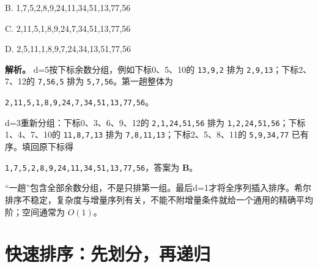 B. 1,7,5,2,8,9,24,11,34,51,13,77,56

C. 2,11,5,1,8,9,24,7,34,51,13,77,56

D. 2,5,11,1,8,9,7,24,34,13,51,77,56


\textbf{解析。} d=5按下标余数分组，例如下标0、5、10的 \allowbreak{}\texttt{13,}\allowbreak{}\texttt{9,}\allowbreak{}\texttt{2} 排为 \allowbreak{}\texttt{2,}\allowbreak{}\texttt{9,}\allowbreak{}\texttt{13}；下标2、7、12的 \allowbreak{}\texttt{7,}\allowbreak{}\texttt{56,}\allowbreak{}\texttt{5} 排为 \allowbreak{}\texttt{5,}\allowbreak{}\texttt{7,}\allowbreak{}\texttt{56}。第一趟整体为

\allowbreak{}\texttt{2,}\allowbreak{}\texttt{11,}\allowbreak{}\texttt{5,}\allowbreak{}\texttt{1,}\allowbreak{}\texttt{8,}\allowbreak{}\texttt{9,}\allowbreak{}\texttt{24,}\allowbreak{}\texttt{7,}\allowbreak{}\texttt{34,}\allowbreak{}\texttt{51,}\allowbreak{}\texttt{13,}\allowbreak{}\texttt{77,}\allowbreak{}\texttt{56}。

d=3重新分组：下标0、3、6、9、12的 \allowbreak{}\texttt{2,}\allowbreak{}\texttt{1,}\allowbreak{}\texttt{24,}\allowbreak{}\texttt{51,}\allowbreak{}\texttt{56} 排为 \allowbreak{}\texttt{1,}\allowbreak{}\texttt{2,}\allowbreak{}\texttt{24,}\allowbreak{}\texttt{51,}\allowbreak{}\texttt{56}；下标1、4、7、10的 \allowbreak{}\texttt{11,}\allowbreak{}\texttt{8,}\allowbreak{}\texttt{7,}\allowbreak{}\texttt{13} 排为 \allowbreak{}\texttt{7,}\allowbreak{}\texttt{8,}\allowbreak{}\texttt{11,}\allowbreak{}\texttt{13}；下标2、5、8、11的 \allowbreak{}\texttt{5,}\allowbreak{}\texttt{9,}\allowbreak{}\texttt{34,}\allowbreak{}\texttt{77} 已有序。填回原下标得

\allowbreak{}\texttt{1,}\allowbreak{}\texttt{7,}\allowbreak{}\texttt{5,}\allowbreak{}\texttt{2,}\allowbreak{}\texttt{8,}\allowbreak{}\texttt{9,}\allowbreak{}\texttt{24,}\allowbreak{}\texttt{11,}\allowbreak{}\texttt{34,}\allowbreak{}\texttt{51,}\allowbreak{}\texttt{13,}\allowbreak{}\texttt{77,}\allowbreak{}\texttt{56}，答案为 \textbf{B}。

``一趟''包含全部余数分组，不是只排第一组。最后d=1才将全序列插入排序。希尔排序不稳定，复杂度与增量序列有关，不能不附增量条件就给一个通用的精确平均阶；空间通常为 \(O(1)\)。

\section{快速排序：先划分，再递归}\label{ds-08-06}

